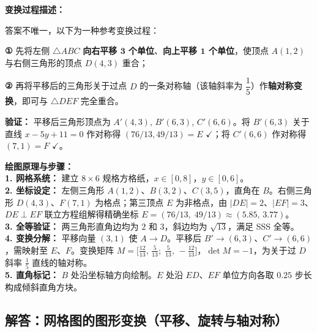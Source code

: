 \vspace{0.3cm}
\textbf{变换过程描述：}

答案不唯一，以下为一种参考变换过程：

\textbf{①} 先将左侧 $\triangle ABC$ \textbf{向右平移 $\mathbf{3}$ 个单位}、\textbf{向上平移 $\mathbf{1}$ 个单位}，使顶点 $A(1,2)$ 与右侧三角形的顶点 $D(4,3)$ 重合；

\textbf{②} 再将平移后的三角形关于过点 $D$ 的一条对称轴（该轴斜率为 $\dfrac{1}{5}$）作\textbf{轴对称变换}，即可与 $\triangle DEF$ 完全重合。

\vspace{0.2cm}
{\small
\textbf{验证：} 平移后三角形顶点为 $A'(4,3)$, $B'(6,3)$, $C'(6,6)$。将 $B'(6,3)$ 关于直线 $x - 5y + 11 = 0$ 作对称得 $(76/13, 49/13) = E$ $\checkmark$；将 $C'(6,6)$ 作对称得 $(7, 1) = F$ $\checkmark$。
}

\vspace{0.4cm}
{\small\color{blue!70!black}
\textbf{绘图原理与步骤：}\\
\textbf{1. 网格系统：} 建立 $8 \times 6$ 规格方格纸，$x \in [0,8]$，$y \in [0,6]$。\\
\textbf{2. 坐标设定：} 左侧三角形 $A(1,2)$、$B(3,2)、C(3,5)$，直角在 $B$。右侧三角形 $D(4,3)$、$F(7,1)$ 为格点；第三顶点 $E$ 为非格点，由 $|DE|=2、|EF|=3$、$DE \perp EF$ 联立方程组解得精确坐标 $E = (76/13,\; 49/13) \approx (5.85,\, 3.77)$。\\
\textbf{3. 全等验证：} 两三角形直角边均为 $2$ 和 $3$，斜边均为 $\sqrt{13}$，满足 SSS 全等。\\
\textbf{4. 变换分解：} 平移向量 $(3,1)$ 使 $A \to D$。平移后 $B' \to (6,3)$、$C' \to (6,6)$，需映射至 $E$、$F$。变换矩阵 $M = \bigl[\frac{12}{13},\, \frac{5}{13};\; \frac{5}{13},\, {-}\frac{12}{13}\bigr]$，$\det M = -1$，为关于过 $D$ 斜率 $\frac{1}{5}$ 直线的轴对称。\\
\textbf{5. 直角标记：} $B$ 处沿坐标轴方向绘制。$E$ 处沿 $ED$、$EF$ 单位方向各取 $0.25$ 步长构成倾斜直角方块。
}


\newpage

\subsection{解答：网格图的图形变换（平移、旋转与轴对称）}

\vspace{0.4cm}

